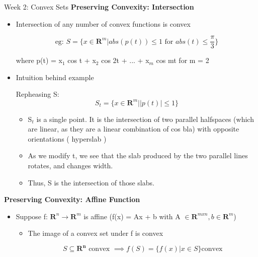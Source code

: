 \documentclass{article}
\begin{document}
\begin{homeworkProblemName}{{\LARGE Week 2: Convex Sets}}
  \vspace{0.2 cm} \textbf{\large Preserving Convexity: Intersection}
  
  \begin{problemAnswer}{
      \begin{itemize}
      \item Intersection of any number of convex functions is convex

        \[\text{eg: } S = \{x \in \bm{R}^m | abs(p(t)) \leq 1 \text{ for } abs(t) \leq
          \frac{\pi}{3}\}\]

        where p(t) = x$_1$ cos t + x$_2$ cos 2t + ... + x$_m$ cos mt for m = 2

      \item Intuition behind example

         Repheasing S: \[S_t = \{x \in \bm{R}^m | |p(t)| \leq 1\}\]
         
         \begin{itemize}
         \item S$_t$ is a single point. It is the intersection of two parallel
           halfspaces (which are linear, as they are a linear combination of cos
           bla) with opposite orientations (
           hyperslab )

         \item As we modify t, we see that the slab produced by the two parallel lines
           rotates, and changes width.

         \item Thus, S is the intersection of those slabs.
           
         \end{itemize}  
      \end{itemize}
    }\end{problemAnswer}  

  \vspace{0.2 cm} \textbf{\large Preserving Convexity: Affine Function}
  
  \begin{problemAnswer}{
      \begin{itemize}
      \item Suppose f: $\bm{R}^n \to \bm{R}^m$ is affine (f(x) = Ax + b with A $\in
        \bm{R}^{m x n}, b \in \bm{R}^m$)

        \begin{itemize}
        \item The image of a convex set under f is convex

          \[S \subseteq \bm{R^n} \text{ convex } \implies f(S) = \{f(x) | x \in S\} \text{
              convex}\]


\end{itemize}
\end{itemize}}
\end{problemAnswer}
\end{homeworkProblemName}
\end{document}
